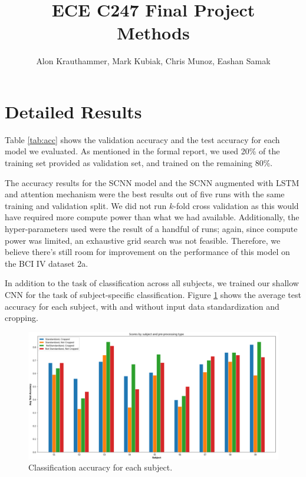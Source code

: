 \documentclass{article}
\author{Alon Krauthammer, Mark Kubiak, Chris Munoz, Eashan Samak}
\title{ECE C247 Final Project\\
Methods}
\begin{document}
\maketitle

\section{Detailed Results}
Table \ref{tab:acc} shows the validation accuracy and the test accuracy for each
model we evaluated. As mentioned in the formal report, we used 20\% of the
training set provided as validation set, and trained on the remaining 80\%.

The accuracy results for the SCNN model and the SCNN augmented with LSTM and
attention mechanism were the best results out of five runs with the same
training and validation split.
We did not run $k$-fold cross validation as this would have required more
compute power than what we had available. Additionally, the hyper-parameters
used were the result of a handful of runs; again, since compute power was
limited, an exhaustive grid search was not feasible. Therefore, we believe
there's still room for improvement on the performance of this model on the BCI
IV dataset 2a. 

In addition to the task of classification across all subjects, we trained our
shallow CNN for the task of subject-specific classification.
Figure \ref{fig:subj-acc} shows the average test accuracy for each subject, with
and without input data standardization and cropping.

\begin{figure}[ht]
    \centering
    \includegraphics[scale=0.33]{img/subject-scores.png}
    \caption{Classification accuracy for each subject.}
    \label{fig:subj-acc}
\end{figure}

\pagebreak
\end{document}
